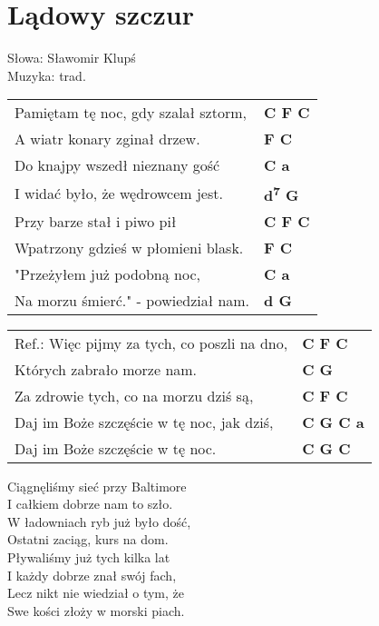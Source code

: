 \section{Lądowy szczur}

Słowa: Sławomir Klupś\\
Muzyka:  trad.

\vspace{2em}
\begin{tabular}{@{}p{9cm}@{}l@{}}
Pamiętam tę noc, gdy szalał sztorm, & \bfseries  C F C \\
A wiatr konary zginał drzew. & \bfseries  F C \\
Do knajpy wszedł nieznany gość & \bfseries  C a \\
I widać było, że wędrowcem jest. & \bfseries  d\textsuperscript{7} G \\
Przy barze stał i piwo pił & \bfseries  C F C \\
Wpatrzony gdzieś w płomieni blask. & \bfseries  F C \\
"Przeżyłem już podobną noc, & \bfseries  C a \\
Na morzu śmierć." - powiedział nam. & \bfseries  d G \\
\end{tabular}

\vspace{1em}
\begin{tabular}{@{}p{9cm}@{}l@{}}
Ref.: Więc pijmy za tych, co poszli na dno, & \bfseries  C F C \\
Których zabrało morze nam. & \bfseries  C G \\
Za zdrowie tych, co na morzu dziś są, & \bfseries  C F C \\
Daj im Boże szczęście w tę noc, jak dziś, & \bfseries  C G C a \\
Daj im Boże szczęście w tę noc. & \bfseries  C G C \\
\end{tabular}

\vspace{1em}
Ciągnęliśmy sieć przy Baltimore \\
I całkiem dobrze nam to szło. \\
W ładowniach ryb już było dość, \\
Ostatni zaciąg, kurs na dom. \\
Pływaliśmy już tych kilka lat \\
I każdy dobrze znał swój fach, \\
Lecz nikt nie wiedział o tym, że \\
Swe kości złoży w morski piach. \\
\newpage

